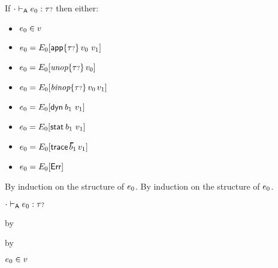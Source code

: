 \begin{lemma}\label{A-decomposition}
  If\/ ${\cdot} \vdash_{\mathsf{A}} e_0 : {\tau{\scriptstyle ?}}$ then either:
  \begin{itemize}
    \item
      $e_0 \in v$
    \item
      $e_0 = E_0[\mathsf{app}{\{{\tau{\scriptstyle ?}}\}}\,v_0~v_1]$
    \item
      $e_0 = E_0[\textit{unop}{\{{\tau{\scriptstyle ?}}\}}\,v_0]$
    \item
      $e_0 = E_0[\textit{binop}{\{{\tau{\scriptstyle ?}}\}}\,v_0\,v_1]$
    \item
      $e_0 = E_0[\mathsf{dyn}^{}\,b_1~v_1]$
    \item
      $e_0 = E_0[\mathsf{stat}^{}\,b_1~v_1]$
    \item
      $\sexpr_0 \eeq \ctx_0[\eprehist{\sblist_1}{\svalue_1}]$
    \item
      $e_0 = E_0[\mathsf{Err}]$
  \end{itemize}
\end{lemma}{
  \newcommand{\shortproof}{By induction on the structure of $\sexpr_0$.}
\begin{lamportproof*}
  \shortproof
\mainproof\leavevmode
  \shortproof

    \begin{pfproof}
      \absurdstep
        \begin{pfproof}
          ${\cdot} \vdash_{\mathsf{A}} e_0 : {\tau{\scriptstyle ?}}$
        \end{pfproof}
    \end{pfproof}

    \begin{pfproof}
      \qedstep
    \end{pfproof}

    \begin{pfproof}
        \begin{pfproof}
          \qedstep
            \begin{pfproof}
              by \pfih
            \end{pfproof}
        \end{pfproof}
        \begin{pfproof}
          \qedstep
            \begin{pfproof}
              by \pfih
            \end{pfproof}
        \end{pfproof}
        \begin{pfproof}
          \qedstep
            \begin{pfproof}
              $e_0 \in v$
            \end{pfproof}
        \end{pfproof}
    \end{pfproof}


\end{lamportproof*}}
